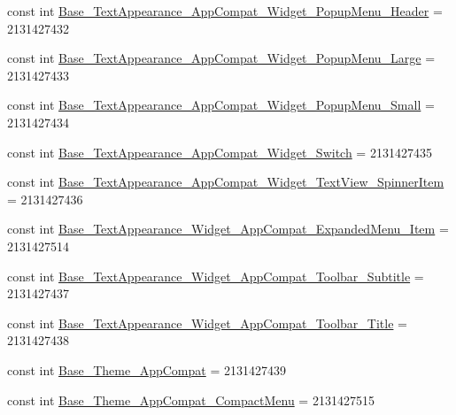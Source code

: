 \begin{DoxyCompactItemize}
\item 
const int \mbox{\hyperlink{class_f_w_p_s___app_1_1_droid_1_1_resource_1_1_style_a38517728381419ab0dd46a8758446f48}{Base\+\_\+\+Text\+Appearance\+\_\+\+App\+Compat\+\_\+\+Widget\+\_\+\+Popup\+Menu\+\_\+\+Header}} = 2131427432
\item 
const int \mbox{\hyperlink{class_f_w_p_s___app_1_1_droid_1_1_resource_1_1_style_a08233c5e39c0adcce7c253aa0af70ac8}{Base\+\_\+\+Text\+Appearance\+\_\+\+App\+Compat\+\_\+\+Widget\+\_\+\+Popup\+Menu\+\_\+\+Large}} = 2131427433
\item 
const int \mbox{\hyperlink{class_f_w_p_s___app_1_1_droid_1_1_resource_1_1_style_a33b7c08f0089f990bdd7c6f4beec1afa}{Base\+\_\+\+Text\+Appearance\+\_\+\+App\+Compat\+\_\+\+Widget\+\_\+\+Popup\+Menu\+\_\+\+Small}} = 2131427434
\item 
const int \mbox{\hyperlink{class_f_w_p_s___app_1_1_droid_1_1_resource_1_1_style_a27aec6d5500589b5ee912b99a48eecae}{Base\+\_\+\+Text\+Appearance\+\_\+\+App\+Compat\+\_\+\+Widget\+\_\+\+Switch}} = 2131427435
\item 
const int \mbox{\hyperlink{class_f_w_p_s___app_1_1_droid_1_1_resource_1_1_style_a609ad1ff515e110e101339778158f41f}{Base\+\_\+\+Text\+Appearance\+\_\+\+App\+Compat\+\_\+\+Widget\+\_\+\+Text\+View\+\_\+\+Spinner\+Item}} = 2131427436
\item 
const int \mbox{\hyperlink{class_f_w_p_s___app_1_1_droid_1_1_resource_1_1_style_aeaa269cbcda1f204716cacc49aad7780}{Base\+\_\+\+Text\+Appearance\+\_\+\+Widget\+\_\+\+App\+Compat\+\_\+\+Expanded\+Menu\+\_\+\+Item}} = 2131427514
\item 
const int \mbox{\hyperlink{class_f_w_p_s___app_1_1_droid_1_1_resource_1_1_style_a705f28d390b0fe6bb149b2b605d51ef0}{Base\+\_\+\+Text\+Appearance\+\_\+\+Widget\+\_\+\+App\+Compat\+\_\+\+Toolbar\+\_\+\+Subtitle}} = 2131427437
\item 
const int \mbox{\hyperlink{class_f_w_p_s___app_1_1_droid_1_1_resource_1_1_style_a0f5c03840189c5313edc62b71246d95b}{Base\+\_\+\+Text\+Appearance\+\_\+\+Widget\+\_\+\+App\+Compat\+\_\+\+Toolbar\+\_\+\+Title}} = 2131427438
\item 
const int \mbox{\hyperlink{class_f_w_p_s___app_1_1_droid_1_1_resource_1_1_style_af8d256a686036d0bac9d0566a7440637}{Base\+\_\+\+Theme\+\_\+\+App\+Compat}} = 2131427439
\item 
const int \mbox{\hyperlink{class_f_w_p_s___app_1_1_droid_1_1_resource_1_1_style_a9caca7f3733def9dcf38d46502137b17}{Base\+\_\+\+Theme\+\_\+\+App\+Compat\+\_\+\+Compact\+Menu}} = 2131427515

\end{DoxyCompactItemize}
